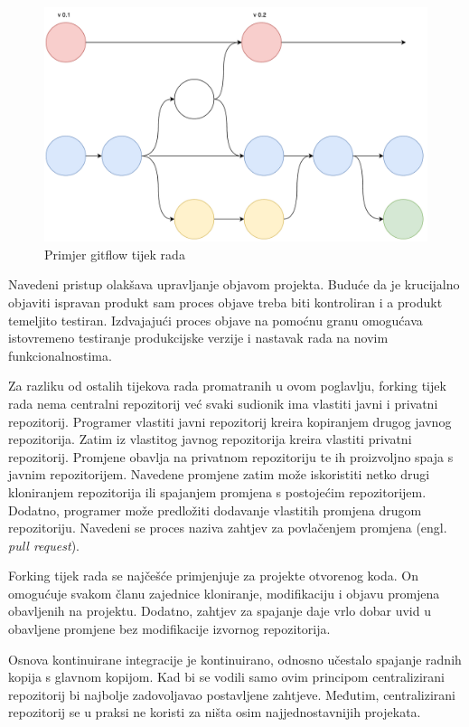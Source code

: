 \documentclass[times, utf8, diplomski, numeric]{fer}
\newcommand{\eng}[1]{(engl. \textit{#1})}
\begin{document}
\begin{figure}
\centering
\includegraphics[scale=0.5]{Gitflow}
\caption{Primjer gitflow tijek rada}
\label{fig:Gitflow}
\end{figure}

Navedeni pristup olakšava upravljanje objavom projekta. Buduće da je krucijalno objaviti ispravan produkt sam proces objave treba biti kontroliran i a produkt temeljito testiran. Izdvajajući proces objave na pomoćnu granu omogućava istovremeno testiranje produkcijske verzije i nastavak rada na novim funkcionalnostima.

Za razliku od ostalih tijekova rada promatranih u ovom poglavlju, forking tijek rada nema centralni repozitorij već svaki sudionik ima vlastiti javni i privatni repozitorij. Programer vlastiti javni repozitorij kreira kopiranjem drugog javnog repozitorija. Zatim iz vlastitog javnog repozitorija kreira vlastiti privatni repozitorij. Promjene obavlja na privatnom repozitoriju te ih proizvoljno spaja s javnim repozitorijem. Navedene promjene zatim može iskoristiti netko drugi kloniranjem repozitorija ili spajanjem promjena s postojećim repozitorijem. Dodatno, programer može predložiti dodavanje vlastitih promjena  drugom repozitoriju. Navedeni se proces naziva zahtjev za povlačenjem promjena \eng{pull request}.

Forking tijek rada se najčešće primjenjuje za projekte otvorenog koda. On omogućuje svakom članu zajednice kloniranje, modifikaciju i objavu promjena obavljenih na projektu. Dodatno, zahtjev za spajanje daje vrlo dobar uvid u obavljene promjene bez modifikacije izvornog repozitorija.

Osnova kontinuirane integracije je kontinuirano, odnosno učestalo spajanje radnih kopija s glavnom kopijom. Kad bi se vodili samo ovim principom centralizirani repozitorij bi najbolje zadovoljavao postavljene zahtjeve. Međutim, centralizirani repozitorij se u praksi ne koristi za ništa osim najjednostavnijih projekata.
\end{document}
